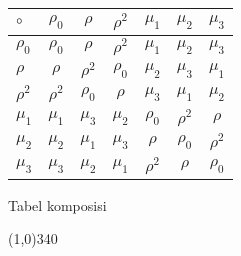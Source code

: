 \documentclass{article}
\begin{document}
    \begin{center}
    \begin{tabular}{|l|| c c c c c c|} 
        \hline
        \rowcolor{cyan}
         \color{purple}$\circ$ & $\rho_0$ & $\rho$ & $\rho^2$ & $\mu_1$ & $\mu_2$ & $\mu_3$\\
         \hline\hline
         $\rho_0$ & $\rho_0$ & $\rho$ & $\rho^2$ & $\mu_1$ & $\mu_2$ & $\mu_3$\\
         $\rho$ & $\rho$ & $\rho^2$ & $\rho_0$ & $\mu_2$ & $\mu_3$ & $\mu_1$\\
         $\rho^2$ & $\rho^2$ & $\rho_0$ & $\rho$ & $\mu_3$ & $\mu_1$ & $\mu_2$\\
         $\mu_1$ & $\mu_1$ & $\mu_3$ & $\mu_2$ & $\rho_0$ & $\rho^2$ & $\rho$\\
         $\mu_2$ & $\mu_2$ & $\mu_1$ & $\mu_3$ & $\rho$ & $\rho_0$ & $\rho^2$\\
         $\mu_3$ & $\mu_3$ & $\mu_2$ & $\mu_1$ & $\rho^2$ & $\rho$ & $\rho_0$\\
         \hline
    \end{tabular}
    
    \vspace{0.9mm}
    Tabel komposisi
    \end{center}
    
    \begin{center}
    \line(1,0){340}
    \end{center}
\end{document}
